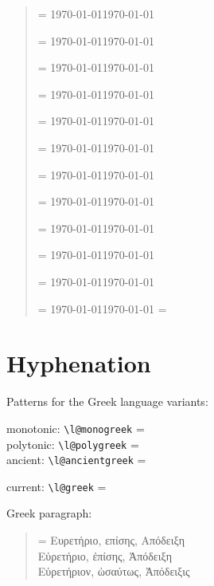 \documentclass[a4paper]{article}
\def\showhyphenpar{\bgroup
   \def\par{\setparams\endgraf\composelines}
   \setbox0=\vbox\bgroup \noindent\hskip0pt\relax}
\def\setparams{\rightskip=0pt plus1fil
   \linepenalty=1000 \pretolerance=-1 \hyphenpenalty=-10000}
\def\composelines{\setbox2=\hbox{}%
   \loop \setbox0=\lastbox \unskip \unpenalty
   \ifhbox0 %
     \global\setbox2=\hbox{\unhbox0\unskip\unhbox2}
   \repeat
   \egroup %
   \exhyphenpenalty=10000 %
   \emergencystretch=4em \leavevmode\unhbox2 \endgraf\egroup}
\begin{document}
\begin{quotation}
  \setcounter{origmonth}{\the\month}
   \month=\value{foo} \today \qquad \MakeUppercase{\today}

   \month=\value{foo} \today \qquad \MakeUppercase{\today}

   \month=\value{foo} \today \qquad \MakeUppercase{\today}

   \month=\value{foo} \today \qquad \MakeUppercase{\today}

   \month=\value{foo} \today \qquad \MakeUppercase{\today}

   \month=\value{foo} \today \qquad \MakeUppercase{\today}

   \month=\value{foo} \today \qquad \MakeUppercase{\today}

   \month=\value{foo} \today \qquad \MakeUppercase{\today}

   \month=\value{foo} \today \qquad \MakeUppercase{\today}

   \month=\value{foo} \today \qquad \MakeUppercase{\today}

   \month=\value{foo} \today \qquad \MakeUppercase{\today}

   \month=\value{foo} \today \qquad \MakeUppercase{\today}
  \month=\value{origmonth}
\end{quotation}


\section{Hyphenation}

Patterns for the Greek language variants:

\makeatletter
monotonic: \verb|\l@monogreek| = \the\l@monogreek \\
polytonic: \verb|\l@polygreek| = \the\l@polygreek \\
ancient:   \verb|\l@ancientgreek| = \the\l@ancientgreek

current: \verb|\l@greek| = \the\l@greek
\makeatletter

Greek paragraph:
\begin{quote}
  \showhyphenpar
   Ευρετήριο,  επίσης,  Απόδειξη \\
   Εὑρετήριο,  ἐπίσης,  Ἀπόδειξη \\
     Εὑρετήριον, ὡσαύτως, Ἀπόδειξις
\end{quote}
\end{document}
